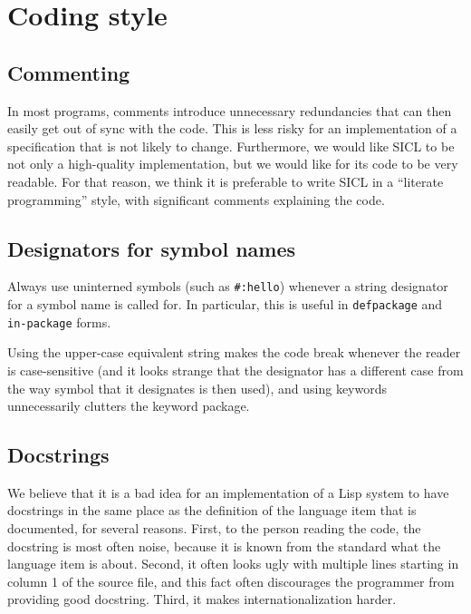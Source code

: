 \documentclass{article}
\def\sysname{SICL}
\begin{document}
\section{Coding style}

\subsection{Commenting}

In most programs, comments introduce unnecessary redundancies that can
then easily get out of sync with the code.  This is less risky for an
implementation of a specification that is not likely to change.
Furthermore, we would like \sysname{} to be not only a high-quality
implementation, but we would like for its code to be very readable.
For that reason, we think it is preferable to write \sysname{} in a
``literate programming'' style, with significant comments explaining
the code. 

\subsection{Designators for symbol names}

Always use uninterned symbols (such as \texttt{\#:hello}) whenever a
string designator for a symbol name is called for.  In particular,
this is useful in \texttt{defpackage} and \texttt{in-package} forms.

Using the upper-case equivalent string makes the code break whenever
the reader is case-sensitive (and it looks strange that the designator
has a different case from the way symbol that it designates is then
used), and using keywords unnecessarily clutters the keyword package.

\subsection{Docstrings}

We believe that it is a bad idea for an implementation of a Lisp
system to have docstrings in the same place as the definition of the
language item that is documented, for several reasons.  First, to the
person reading the code, the docstring is most often noise, because it
is known from the standard what the language item is about.  Second,
it often looks ugly with multiple lines starting in column 1 of the
source file, and this fact often discourages the programmer from
providing good docstring.  Third, it makes internationalization
harder.
\end{document}
